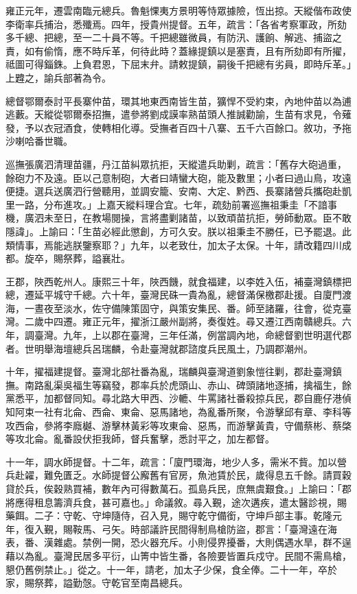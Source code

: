 \begin{pinyinscope}
雍正元年，遷雲南臨元總兵。魯魁惈夷方景明等恃眾據險，恆出掠。天縱偕布政使李衛率兵捕治，悉殲焉。四年，授貴州提督。五年，疏言：「各省考察軍政，所劾多千總、把總，至一二十員不等。千把總雖微員，有防汛、護餉、解逃、捕盜之責，如有偷惰，應不時斥革，何待此時？蓋緣提鎮以是塞責，且有所劾即有所擢，祗圖可得錙銖。上負君恩，下屈末弁。請敕提鎮，嗣後千把總有劣員，即時斥革。」上韙之，諭兵部著為令。

總督鄂爾泰討平長寨仲苗，環其地東西南皆生苗，獷悍不受約束，內地仲苗以為逋逃藪。天縱從鄂爾泰招撫，遣參將劉成謨率熟苗頭人推誠勸諭，生苗有求見，令薙發，予以衣冠酒食，使轉相化導。受撫者百四十八寨、五千六百餘口。敘功，予拖沙喇哈番世職。

巡撫張廣泗清理苗疆，丹江苗糾眾抗拒，天縱遣兵助剿，疏言：「舊存大砲過重，餘砲力不及遠。臣以己意制砲，大者曰靖蠻大砲，能及數里；小者曰過山鳥，攻遠便捷。選兵送廣泗行營聽用，並調安籠、安南、大定、黔西、長寨諸營兵攜砲赴凱里一路，分布進攻。」上嘉天縱料理合宜。七年，疏劾前署巡撫祖秉圭「不諳事機，廣泗未至日，在教場閱操，言將盡剿諸苗，以致頑苗抗拒，勞師動眾。臣不敢隱諱」。上諭曰：「生苗必經此懲創，方可久安。朕以祖秉圭不勝任，已予罷退。此類情事，焉能逃朕鑒察耶？」九年，以老致仕，加太子太保。十年，請改籍四川成都。旋卒，賜祭葬，謚襄壯。

王郡，陜西乾州人。康熙三十年，陜西饑，就食福建，以李姓入伍，補臺灣鎮標把總，遷延平城守千總。六十年，臺灣民硃一貴為亂，總督滿保檄郡赴援。自廈門渡海，一晝夜至淡水，佐守備陳策固守，與策安集民、番。師至諸羅，往會，從克臺灣。二歲中四遷。雍正元年，擢浙江嚴州副將，奏復姓。尋又遷江西南贛總兵。六年，調臺灣。九年，上以郡在臺灣，三年任滿，例當調內地，命總督劉世明選代郡者。世明舉海壇總兵呂瑞麟，令赴臺灣就郡諮度兵民風土，乃調郡潮州。

十年，擢福建提督。臺灣北部社番為亂，瑞麟與臺灣道劉象愷往剿，郡赴臺灣鎮撫。南路亂渠吳福生等竊發，郡率兵於虎頭山、赤山、碑頭諸地逐捕，擒福生，餘黨悉平，加都督同知。尋北路大甲西、沙轆、牛罵諸社番殺掠兵民，郡自鹿仔港偵知阿束一社有北侖、西侖、東侖、惡馬諸地，為亂番所聚，令游擊邱有章、李科等攻西侖，參將李廕樾、游擊林黃彩等攻東侖、惡馬，而游擊黃貴，守備蔡彬、蔡棨等攻北侖。亂番設伏拒我師，督兵奮擊，悉討平之，加左都督。

十一年，調水師提督。十二年，疏言：「廈門環海，地少人多，需米不貲。加以營兵赴糴，難免匱乏。水師提督公廨舊有官房，魚池賃於民，歲得息五千餘。請買穀貸於兵，俟穀熟買補，數年內可得數萬石。孤島兵民，庶無虞艱食。」上諭曰：「郡將應得租息籌濟兵食，甚可嘉也。」命議敘。尋入覲，途次遘疾，遣太醫診視，賜藥餌。二子：守乾、守坤隨侍，召入見，賜守乾守備銜，守坤戶部主事。乾隆元年，復入覲，賜鞍馬、弓矢。時部議許民間得制鳥槍防盜，郡言：「臺灣遠在海表，番、漢雜處。禁例一開，恐火器充斥。小則侵界擾番，大則偶遇水旱，群不逞藉以為亂。臺灣民居多平衍，山箐中皆生番，各險要皆置兵戍守。民間不需鳥槍，懇仍舊例禁止。」從之。十一年，請老，加太子少保，食全俸。二十一年，卒於家，賜祭葬，謚勤愨。守乾官至南昌總兵。


\end{pinyinscope}
